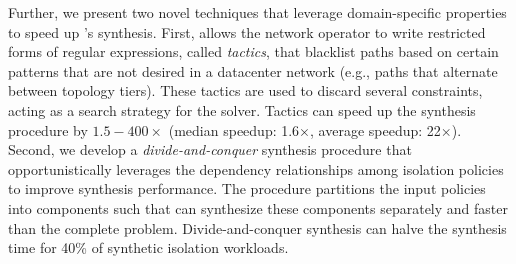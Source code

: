 
Further, we present two novel techniques that leverage domain-specific properties to speed up \Name's synthesis.
First, \Name
allows the network operator to write restricted forms of regular
expressions, called \emph{tactics}, that blacklist paths based on
certain patterns that are not desired in a datacenter network (e.g.,
paths that alternate between topology tiers).
These tactics are used to discard several constraints, 
acting as a search strategy for the solver.
Tactics can speed up the synthesis procedure by
$1.5-400\times$ (median speedup: 1.6$\times$, average speedup:
22$\times$).
 Second, we develop a \emph{divide-and-conquer} synthesis procedure
 that opportunistically leverages the dependency relationships among
 isolation policies to improve synthesis performance. The procedure
 partitions the input policies into components such that
 \name can synthesize these components separately and faster than the
 complete problem.  Divide-and-conquer synthesis can halve the
 synthesis time for 40\% of synthetic isolation workloads.


